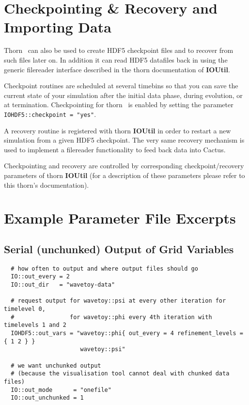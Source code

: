 \documentclass{article}
\begin{document}
\section{Checkpointing \& Recovery and Importing Data}

Thorn \ThisThorn\ can also be used to create HDF5 checkpoint files and
to recover from such files later on. In addition it can read HDF5 datafiles
back in using the generic filereader interface described in the thorn
documentation of {\bf IOUtil}.

Checkpoint routines are scheduled at several timebins so that you can save
the current state of your simulation after the initial data phase,
during evolution, or at termination. Checkpointing for thorn \ThisThorn\ 
is enabled by setting the parameter {\tt IOHDF5::checkpoint = "yes"}.

A recovery routine is registered with thorn {\bf IOUtil} in order to restart
a new simulation from a given HDF5 checkpoint.
The very same recovery mechanism is used to implement a filereader
functionality to feed back data into Cactus.

Checkpointing and recovery are controlled by corresponding checkpoint/recovery
parameters of thorn {\bf IOUtil} (for a description of these parameters please
refer to this thorn's documentation).


\section{Example Parameter File Excerpts}

\subsection{Serial (unchunked) Output of Grid Variables}

\begin{verbatim}
  # how often to output and where output files should go
  IO::out_every = 2
  IO::out_dir   = "wavetoy-data"

  # request output for wavetoy::psi at every other iteration for timelevel 0,
  #                for wavetoy::phi every 4th iteration with timelevels 1 and 2
  IOHDF5::out_vars = "wavetoy::phi{ out_every = 4 refinement_levels = { 1 2 } }
                      wavetoy::psi"

  # we want unchunked output
  # (because the visualisation tool cannot deal with chunked data files)
  IO::out_mode      = "onefile"
  IO::out_unchunked = 1
\end{verbatim}
\end{document}
